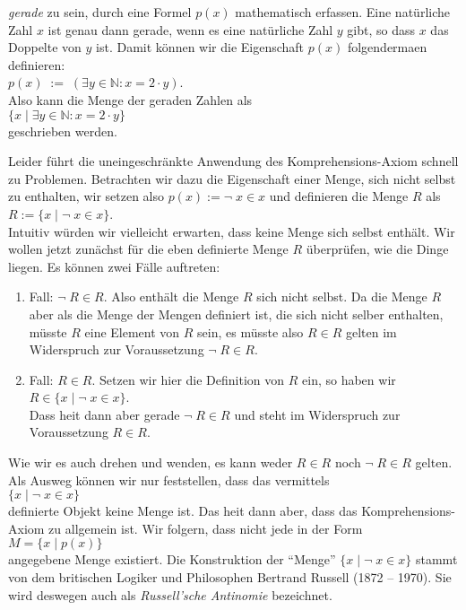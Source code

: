 \emph{gerade} zu sein, durch eine Formel $p(x)$ mathematisch erfassen.  Eine nat\"{u}rliche Zahl $x$ ist
genau dann gerade, wenn es eine nat\"{u}rliche Zahl $y$ gibt, so dass $x$ das Doppelte von $y$
ist.  Damit k\"{o}nnen wir die Eigenschaft $p(x)$ folgenderma\3en
definieren: \\[0.2cm]
\hspace*{1.3cm} $p(x) \;:=\; (\exists y\in \mathbb{N}: x = 2 \cdot y)$. \\[0.2cm]
Also kann die Menge der geraden Zahlen als \\[0.2cm]
\hspace*{1.3cm} $\{ x \;|\; \exists y\in \mathbb{N}: x = 2 \cdot y \}$ \\[0.2cm]
geschrieben werden.

Leider f\"{u}hrt die uneingeschr\"{a}nkte Anwendung des Komprehensions-Axiom schnell zu
Problemen.  Betrachten wir dazu die Eigenschaft einer Menge, sich nicht selbst zu enthalten, wir
setzen also $p(x) := \neg\; x \in x$ und definieren die Menge $R$ als \\[0.2cm]
\hspace*{1.3cm} $R := \{ x \;|\; \neg\; x \in x \}$.  \\[0.2cm]
Intuitiv w\"{u}rden wir vielleicht erwarten, dass keine Menge sich selbst enth\"{a}lt.  Wir wollen
jetzt zun\"{a}chst f\"{u}r die eben definierte Menge $R$ \"{u}berpr\"{u}fen, wie die Dinge liegen.
Es k\"{o}nnen zwei F\"{a}lle auftreten:
\begin{enumerate}
\item Fall: $\neg\; R \in R$. Also enth\"{a}lt die Menge $R$ sich nicht selbst.
      Da die Menge $R$ aber als die Menge der Mengen definiert ist, die sich nicht selber
      enthalten, m\"{u}sste $R$ eine Element von $R$ sein, es m\"{u}sste also
      $R \in R$ gelten im Widerspruch zur Voraussetzung $\neg\; R \in R$.
\item Fall: $R \in R$. Setzen wir hier die Definition von $R$ ein, so haben wir \\[0.2cm]
      \hspace*{1.3cm}  $R \in \{ x \;|\; \neg\; x \in x \}$. \\[0.2cm]
      Dass hei\3t dann aber gerade $\neg\; R \in R$ und steht im Widerspruch zur
      Voraussetzung $R \in R$.
\end{enumerate}
Wie wir es auch drehen und wenden, es kann weder $R \in R$ noch $\neg\; R \in R$ gelten. 
Als Ausweg k\"{o}nnen wir nur feststellen, dass das vermittels \\[0.2cm]
\hspace*{1.3cm} $\{ x \mid \neg\; x \in x \}$ \\[0.2cm]
definierte Objekt keine Menge ist.
Das hei\3t dann aber, dass das Komprehensions-Axiom
zu allgemein ist.  Wir folgern, dass nicht jede  in der Form \\[0.2cm]
\hspace*{1.3cm} $M = \{ x \mid p(x) \}$ \\[0.2cm]
angegebene Menge  existiert.  Die Konstruktion der ``Menge''
$\{x \mid \neg\; x \in x\}$ stammt von dem britischen Logiker und Philosophen Bertrand
Russell (1872 -- 1970).  Sie wird deswegen auch als \emph{Russell'sche Antinomie} bezeichnet.


